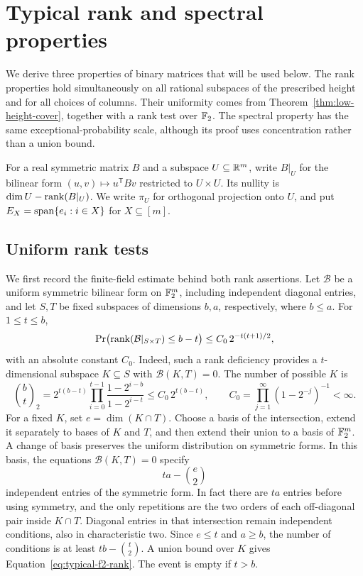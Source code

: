 \section{Typical rank and spectral properties}\label{sec:typical}

We derive three properties of binary matrices that will be used below.
The rank properties hold simultaneously on all rational subspaces of
the prescribed height and for all choices of columns. Their uniformity
comes from Theorem~\ref{thm:low-height-cover}, together with a rank test
over \(\mathbb F_2\). The spectral property has the same exceptional-probability
scale, although its proof uses concentration rather than a union bound.

For a real symmetric matrix \(B\) and a subspace \(U\subseteq\mathbb R^m\),
write \(B|_U\) for the bilinear form
\((u,v)\mapsto u^{\mathsf T}Bv\) restricted to \(U\times U\).
Its nullity is \(\dim U-\operatorname{rank}(B|_U)\). We write \(\pi_U\) for
orthogonal projection onto \(U\), and put
\(E_X=\operatorname{span}\{e_i:i\in X\}\) for \(X\subseteq[m]\).

\subsection{Uniform rank tests}

We first record the finite-field estimate behind both rank assertions.
Let \(\mathcal B\) be a uniform symmetric bilinear form on \(\mathbb F_2^m\),
including independent diagonal entries, and let \(S,T\) be fixed
subspaces of dimensions \(b,a\), respectively, where \(b\le a\).
For \(1\le t\le b\),
\begin{equation}\label{eq:typical-f2-rank}
 \Pr\bigl(\operatorname{rank}(\mathcal B|_{S\times T})\le b-t\bigr)
 \le C_0\,2^{-t(t+1)/2},
\end{equation}
with an absolute constant \(C_0\). Indeed, such a rank deficiency
provides a \(t\)-dimensional subspace \(K\subseteq S\) with
\(\mathcal B(K,T)=0\). The number of possible \(K\) is
\[
 \binom bt_{\!2}
 =2^{t(b-t)}\prod_{i=0}^{t-1}
       \frac{1-2^{i-b}}{1-2^{i-t}}
 \le C_0\,2^{t(b-t)},
 \qquad
 C_0=\prod_{j=1}^{\infty}(1-2^{-j})^{-1}<\infty.
\]
For a fixed \(K\), set \(e=\dim(K\cap T)\). Choose a basis of the
intersection, extend it separately to bases of \(K\) and \(T\), and
then extend their union to a basis of \(\mathbb F_2^m\). A change of basis
preserves the uniform distribution on symmetric forms. In this basis,
the equations \(\mathcal B(K,T)=0\) specify
\[
 ta-\binom e2
\]
independent entries of the symmetric form. In fact there are \(ta\)
entries before using symmetry, and the only repetitions are the two
orders of each off-diagonal pair inside \(K\cap T\). Diagonal entries
in that intersection remain independent conditions, also in
characteristic two. Since \(e\le t\) and \(a\ge b\), the number of
conditions is at least \(tb-\binom t2\). A union bound over \(K\)
gives Equation~\eqref{eq:typical-f2-rank}. The event is empty if
\(t>b\).


